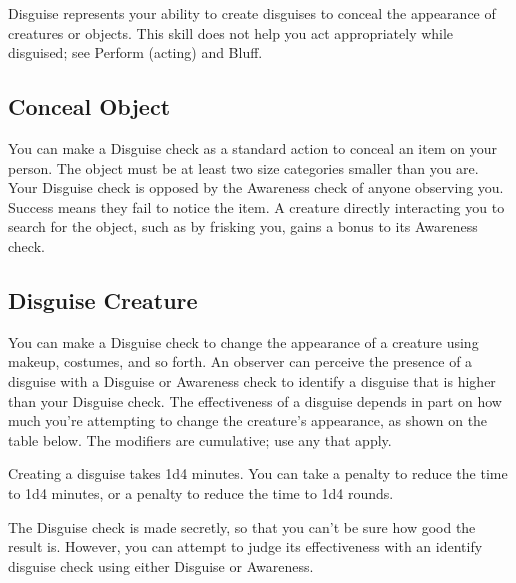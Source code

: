         Disguise represents your ability to create disguises to conceal the appearance of creatures or objects. This skill does not help you act appropriately while disguised; see Perform (acting) and Bluff.

    \subsection{Conceal Object}
        You can make a Disguise check as a standard action to conceal an item on your person. The object must be at least two size categories smaller than you are. Your Disguise check is opposed by the Awareness check of anyone observing you. Success means they fail to notice the item. A creature directly interacting you to search for the object, such as by frisking you, gains a  bonus to its Awareness check.

    \subsection{Disguise Creature}
        You can make a Disguise check to change the appearance of a creature using makeup, costumes, and so forth. An observer can perceive the presence of a disguise with a Disguise or Awareness check to identify a disguise that is higher than your Disguise check. The effectiveness of a disguise depends in part on how much you're attempting to change the creature's appearance, as shown on the table below. The modifiers are cumulative; use any that apply.

        Creating a disguise takes 1d4  minutes. You can take a  penalty to reduce the time to 1d4 minutes, or a  penalty to reduce the time to 1d4 rounds.

        The Disguise check is made secretly, so that you can't be sure how good the result is. However, you can attempt to judge its effectiveness with an identify disguise check using either Disguise or Awareness.

